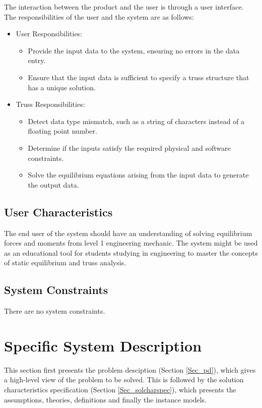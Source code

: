 \documentclass[12pt]{article}
\begin{document}
The interaction between the product and the user is through a user interface. 
The responsibilities of the user and the system are as follows:

\begin{itemize}
\item User Responsibilities:
\begin{itemize}
\item Provide the input data to the system, ensuring no errors in the data 
entry.
\item Ensure that the input data is sufficient to specify a truss structure 
that has a unique solution.
\end{itemize}
\item Truss Responsibilities:
\begin{itemize}
\item Detect data type mismatch, such as a string of characters instead of a
  floating point number.
\item Determine if the inputs satisfy the required physical and software 
constraints.
\item Solve the equilibrium equations arising from the input data to generate 
the output data.
\end{itemize}
\end{itemize}

\subsection{User Characteristics} \label{SecUserCharacteristics}
The end user of the system should have an understanding of solving equilibrium 
forces and moments from level 1 engineering mechanic. The system might be used 
as an educational tool for students studying in engineering to master the 
concepts of static equilibrium and truss analysis.

\subsection{System Constraints}
There are no system constraints.

\section{Specific System Description}

This section first presents the problem desciption (Section \ref{Sec_pd}), 
which gives a high-level view of the problem to be solved.  This is followed by 
the solution characteristics specification (Section \ref{Sec_solcharspec}), 
which presents the assumptions, theories, definitions and finally the instance 
models.  
\end{document}
